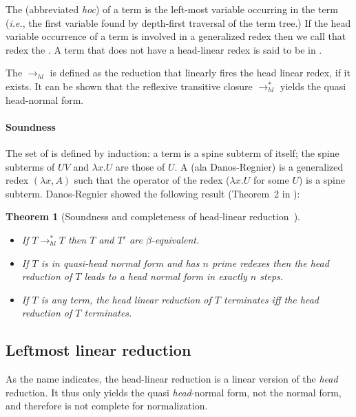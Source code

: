 \documentclass{elsarticle}
\makeatletter
\theoremstyle{plain}
\newtheorem{theorem}{Theorem}[section]
\theoremstyle{definition}
\theoremstyle{remark}
\renewcommand\ie{{\it i.e.\@\xspace}}
\newcommand{\hlred}{\rightarrow_{hl}}
\makeatother
\begin{document}
The  (abbreviated \emph{hoc}) of a term is the left-most variable occurring in the term (\ie, the first variable found by depth-first traversal of the term tree.) If the head variable occurrence of a term is involved in a generalized redex then we call that redex the .
A term that does not have a head-linear redex is said to be in .

The  $\hlred$ is defined as the reduction that linearly fires the head linear redex, if it exists\cite{danos-head,danosherbelinregnier1996}. It can be shown that the reflexive transitive closure $\rightarrow^*_{hl}$ yields the quasi head-normal form.

\paragraph{Soundness}
The set of  is defined by induction: a term is a spine subterm of itself; the spine subterms of $U V$ and $\lambda x. U$ are those of $U$.
A  (ala Danos-Regnier) is a generalized redex $(\lambda x, A)$ such that the operator of the redex ($\lambda x . U$ for some $U$) is a spine subterm. Danos-Regnier showed the following result (Theorem~2 in \cite{danos-head}):
\begin{theorem}[Soundness and completeness of head-linear reduction~\cite{danos-head}] \
\label{thm:danosreigner_headlinred}
\begin{itemize}[nosep]
\item If $T \rightarrow^*_{hl} T$  then $T$ and $T'$ are $\beta$-equivalent.
\item If $T$ is in quasi-head normal form and has $n$ prime redexes then the head reduction of $T$ leads to a head normal form in exactly $n$ steps.
\item If $T$ is any term, the head linear reduction of $T$ terminates iff the head reduction of $T$ terminates.
\end{itemize}
\end{theorem}

\subsection{Leftmost linear reduction}

As the name indicates, the head-linear reduction is a linear version of the \emph{head} reduction. It thus only yields the quasi \emph{head}-normal form, not the normal form, and therefore is not complete for normalization.
\end{document}
